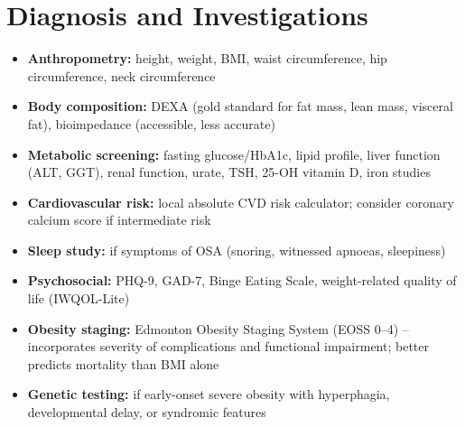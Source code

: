 \section*{Diagnosis and Investigations}
\begin{itemize}
    \item \textbf{Anthropometry:} height, weight, BMI, waist circumference, hip circumference, neck circumference
    \item \textbf{Body composition:} DEXA (gold standard for fat mass, lean mass, visceral fat), bioimpedance (accessible, less accurate)
    \item \textbf{Metabolic screening:} fasting glucose/HbA1c, lipid profile, liver function (ALT, GGT), renal function, urate, TSH, 25-OH vitamin D, iron studies
    \item \textbf{Cardiovascular risk:} local absolute CVD risk calculator; consider coronary calcium score if intermediate risk
    \item \textbf{Sleep study:} if symptoms of OSA (snoring, witnessed apnoeas, sleepiness)
    \item \textbf{Psychosocial:} PHQ-9, GAD-7, Binge Eating Scale, weight-related quality of life (IWQOL-Lite)
    \item \textbf{Obesity staging:} Edmonton Obesity Staging System (EOSS 0--4) -- incorporates severity of complications and functional impairment; better predicts mortality than BMI alone
    \item \textbf{Genetic testing:} if early-onset severe obesity with hyperphagia, developmental delay, or syndromic features
\end{itemize}


